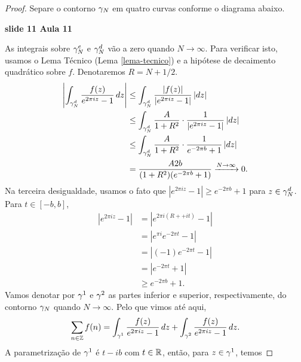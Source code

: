\begin{proof}
            Separe o contorno $\gamma_N$ em quatro curvas conforme o diagrama abaixo. 
            \begin{center}
                {\bf slide 11 Aula 11}
            \end{center}
            As integrais sobre
            $\gamma_N^e$ e $\gamma_N^d$ vão a zero quando $N \to \infty$. Para verificar isto, usamos o 
            Lema Técnico (Lema \ref{lema-tecnico}) e a hipótese de decaimento quadrático sobre $f$. 
            Denotaremos $R = N + 1/2$.
            \begin{align*}
                \left |\int_{\gamma_N^d} \frac{f(z)}{e^{2 \pi i z} - 1}\,dz\right| 
                &\leq \int_{\gamma_N^d} \frac{|f(z)|}{|e^{2 \pi i z} - 1|}\,|dz| \\
                &\leq \int_{\gamma_N^d} \frac{A}{1 + R^2}\cdot\frac{1}{|e^{2 \pi i z} - 1|}\,|dz| \\
                &\leq \int_{\gamma_N^d} \frac{A}{1 + R^2}\cdot\frac{1}{e^{-2\pi b} + 1}\,|dz| \\
                & = \frac{A2b}{(1 + R^2)(e^{-2\pi b} + 1)} \xrightarrow{N \to \infty} 0.
            \end{align*}
            Na terceira desigualdade, usamos o fato que $|e^{2\pi i z} - 1| \geq e^{-2 \pi b} + 1$ 
            para $z \in \gamma_N^d$. Para $t \in [-b,b]$,
            \begin{align*}
                |e^{2 \pi i z} - 1| &= |e^{2 \pi i(R+ + i t)} - 1| \\
                &= |e^{\pi i}e^{-2\pi t} - 1| \\
                & = |(-1)e^{-2\pi t} - 1| \\
                &= |e^{-2\pi t} + 1| \\
                &\geq e^{-2\pi b} + 1.
            \end{align*}
            Vamos denotar por $\gamma^1$ e $\gamma^2$ as partes inferior e superior, respectivamente, 
            do contorno $\gamma_N$ quando $N \to \infty$. Pelo que vimos até aqui,
            \begin{equation*}
                \sum_{n \in \mathbb{Z}}f(n) = \int_{\gamma^1}\frac{f(z)}{e^{2\pi i z} - 1}\,dz 
                                    + \int_{\gamma^2}\frac{f(z)}{e^{2\pi i z} - 1}\,dz.
            \end{equation*}
            A parametrização de $\gamma^1$ é $t - ib$ com $t \in \mathbb{R}$, então, para $z \in \gamma^1$, 
            temos 

\end{proof}
